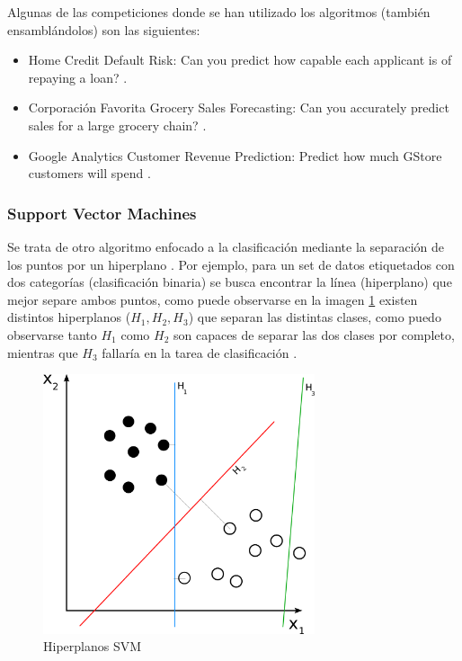 Algunas de las competiciones donde se han utilizado los algoritmos (también ensamblándolos) son las siguientes:

\begin{itemize}
    \setlength\itemsep{0.5cm}
    \item Home Credit Default Risk: Can you predict how capable each applicant is of repaying a loan? \cite{kagglehome}.
    \item Corporación Favorita Grocery Sales Forecasting: Can you accurately predict sales for a large grocery chain? \cite{kagglefav}.
    \item Google Analytics Customer Revenue Prediction: Predict how much GStore customers will spend \cite{kagglegoogle}.
\end{itemize}

\subsubsection{Support Vector Machines}

Se trata de otro algoritmo enfocado a la clasificación mediante la separación de los puntos por un hiperplano \cite{james2013introduction}. Por ejemplo, para un set de datos etiquetados con dos categorías (clasificación binaria) se busca encontrar la línea (hiperplano) que mejor separe ambos puntos, como puede observarse en la imagen \ref{fig:svm} existen distintos hiperplanos (\(H_1 , H_2 , H_3\)) que separan las distintas clases, como puedo observarse tanto \(H_1\) como  \(H_2\) son capaces de separar las dos clases por completo, mientras que \(H_3\) fallaría en la tarea de clasificación .


\begin{figure}[H]
    \centering
    \includegraphics[width=8cm]{figs/Svm_separating_hyperplanes.png}
    \caption{Hiperplanos SVM}
    \label{fig:svm}
\end{figure}

